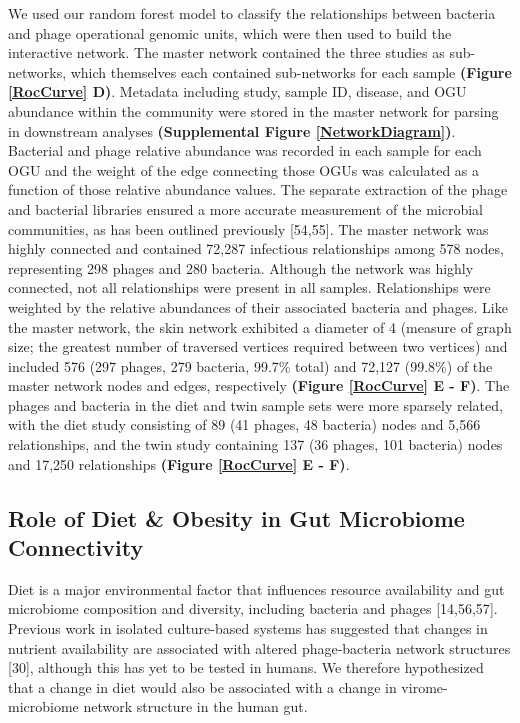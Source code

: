 \documentclass[12pt,]{article}
\begin{document}
We used our random forest model to classify the relationships between
bacteria and phage operational genomic units, which were then used to
build the interactive network. The master network contained the three
studies as sub-networks, which themselves each contained sub-networks
for each sample \textbf{(Figure \ref{RocCurve} D)}. Metadata including
study, sample ID, disease, and OGU abundance within the community were
stored in the master network for parsing in downstream analyses
\textbf{(Supplemental Figure \ref{NetworkDiagram})}. Bacterial and phage
relative abundance was recorded in each sample for each OGU and the
weight of the edge connecting those OGUs was calculated as a function of
those relative abundance values. The separate extraction of the phage
and bacterial libraries ensured a more accurate measurement of the
microbial communities, as has been outlined previously {[}54,55{]}. The
master network was highly connected and contained 72,287 infectious
relationships among 578 nodes, representing 298 phages and 280 bacteria.
Although the network was highly connected, not all relationships were
present in all samples. Relationships were weighted by the relative
abundances of their associated bacteria and phages. Like the master
network, the skin network exhibited a diameter of 4 (measure of graph
size; the greatest number of traversed vertices required between two
vertices) and included 576 (297 phages, 279 bacteria, 99.7\% total) and
72,127 (99.8\%) of the master network nodes and edges, respectively
\textbf{(Figure \ref{RocCurve} E - F)}. The phages and bacteria in the
diet and twin sample sets were more sparsely related, with the diet
study consisting of 89 (41 phages, 48 bacteria) nodes and 5,566
relationships, and the twin study containing 137 (36 phages, 101
bacteria) nodes and 17,250 relationships \textbf{(Figure \ref{RocCurve}
E - F)}.

\subsection{Role of Diet \& Obesity in Gut Microbiome
Connectivity}\label{role-of-diet-obesity-in-gut-microbiome-connectivity}

Diet is a major environmental factor that influences resource
availability and gut microbiome composition and diversity, including
bacteria and phages {[}14,56,57{]}. Previous work in isolated
culture-based systems has suggested that changes in nutrient
availability are associated with altered phage-bacteria network
structures {[}30{]}, although this has yet to be tested in humans. We
therefore hypothesized that a change in diet would also be associated
with a change in virome-microbiome network structure in the human gut.
\end{document}
